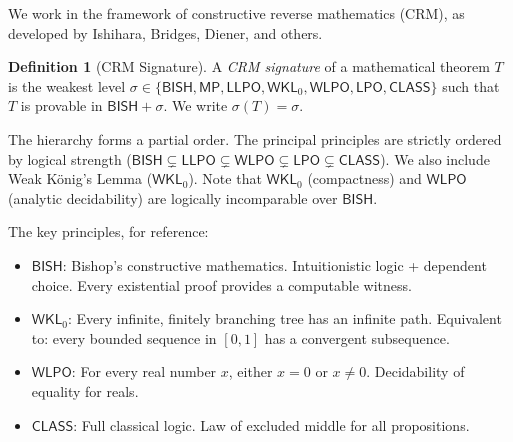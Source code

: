 \documentclass[11pt,a4paper]{article}
\theoremstyle{plain}
\theoremstyle{definition}
\newtheorem{definition}[theorem]{Definition}
\newcommand{\BISH}{\textsf{BISH}}
\newcommand{\WKL}{\textsf{WKL}_0}
\newcommand{\WLPO}{\textsf{WLPO}}
\newcommand{\LLPO}{\textsf{LLPO}}
\newcommand{\LPO}{\textsf{LPO}}
\newcommand{\CLASS}{\textsf{CLASS}}
\newcommand{\sig}{\sigma}
\begin{document}
We work in the framework of constructive reverse mathematics (CRM), as developed by Ishihara, Bridges, Diener, and others. 

\begin{definition}[CRM Signature]
A \emph{CRM signature} of a mathematical theorem $T$ is the weakest level $\sigma \in \{\BISH, \textsf{MP}, \LLPO, \WKL, \WLPO, \LPO, \CLASS\}$ such that $T$ is provable in $\BISH + \sigma$. We write $\sig(T) = \sigma$.
\end{definition}

The hierarchy forms a partial order. The principal principles are strictly ordered by logical strength ($\BISH \subsetneq \LLPO \subsetneq \WLPO \subsetneq \LPO \subsetneq \CLASS$). We also include Weak K\"onig's Lemma ($\WKL$). Note that $\WKL$ (compactness) and $\WLPO$ (analytic decidability) are logically incomparable over $\BISH$.

The key principles, for reference:
\begin{itemize}[leftmargin=2em]
\item $\BISH$: Bishop's constructive mathematics. Intuitionistic logic + dependent choice. Every existential proof provides a computable witness.
\item $\WKL$: Every infinite, finitely branching tree has an infinite path. Equivalent to: every bounded sequence in $[0,1]$ has a convergent subsequence.
\item $\WLPO$: For every real number $x$, either $x = 0$ or $x \neq 0$. Decidability of equality for reals.
\item $\CLASS$: Full classical logic. Law of excluded middle for all propositions.
\end{itemize}
\end{document}
